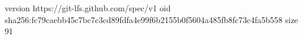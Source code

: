 version https://git-lfs.github.com/spec/v1
oid sha256:fc79caebb45c7bc7c3cd89fdfa4e99f6b2155b0f5604a485fb8fc73c4fa5b558
size 91
